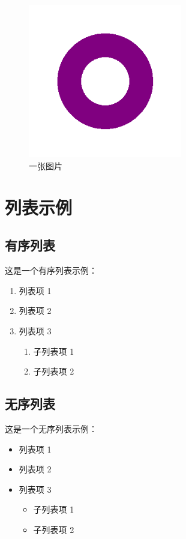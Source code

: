 \documentclass{ranfr}
\begin{document}
\begin{figure}[ht]
    \centering
    \includegraphics[width=0.6\textwidth]{pictures/example.png}
    \caption{一张图片}
\end{figure}

\section{列表示例}
\subsection{有序列表}
这是一个有序列表示例：
\begin{enumerate}
    \item 列表项 1
    \item 列表项 2
    \item 列表项 3
          \begin{enumerate}
              \item 子列表项 1
              \item 子列表项 2
          \end{enumerate}
\end{enumerate}

\subsection{无序列表}

这是一个无序列表示例：

\begin{itemize}
    \item 列表项 1
    \item 列表项 2
    \item 列表项 3
          \begin{itemize}
              \item 子列表项 1
              \item 子列表项 2
          \end{itemize}
\end{itemize}
\end{document}
